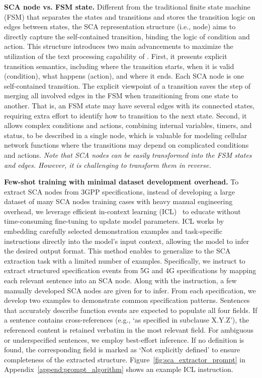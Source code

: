 \noindent\textbf{SCA node vs. FSM state.} Different from the traditional finite state machine (FSM) that separates the states and transitions and stores the transition logic on edges between states, the SCA representation structure (i.e., node) aims to directly capture the self-contained transition, binding the logic of condition and action. This structure introduces two main advancements to maximize the utilization of the text processing capability of \core. 
First, it presents explicit transition semantics, including where the transition starts, when it is valid (condition), what happens (action), and where it ends. Each SCA node is one self-contained transition. 
The explicit viewpoint of a transition saves the step of merging all involved edges in the FSM when transitioning from one state to another.  
That is, an FSM state may have several edges with its connected states, requiring extra effort to identify how to transition to the next state. 
Second, it allows complex conditions and actions, combining internal variables, timers, and status, to be described in a single node, which is valuable for modeling cellular network functions where the transitions may depend on complicated conditions and actions. \textit{Note that SCA nodes can be easily transformed into the FSM states and edges. However, it is challenging to transform them in reverse.} 


\noindent\textbf{Few-shot training with minimal dataset development overhead.}  
To extract SCA nodes from 3GPP specifications, instead of developing a large dataset of many SCA nodes training cases with heavy manual engineering overhead, we leverage efficient in-context learning (ICL)~\cite{brown2020language} to educate \lm without time-consuming fine-tuning to update model parameters.
ICL works by embedding carefully selected demonstration examples and task-specific instructions directly into the model’s input context, allowing the model to infer the desired output format. This method enables \lm to generalize to the SCA extraction task with a limited number of examples. 
Specifically, we instruct \lm to extract structured specification events from 5G and 4G specifications by mapping each relevant sentence into an SCA node. 
Along with the instruction, a few manually developed SCA nodes are given for \lm to infer. From each specification, we develop two examples to demonstrate common specification patterns. 
Sentences that accurately describe function events are expected to populate all four fields. 
If a sentence contains cross-references (e.g., `as specified in subclause X.Y.Z'), the referenced content is retained verbatim in the most relevant field. For ambiguous or underspecified sentences, we employ best-effort inference. If no definition is found, the corresponding field is marked as `Not explicitly defined' to ensure completeness of the extracted structure. Figure~\ref{fig:sca_extractor_prompt} in Appendix~\ref{append:prompt_algorithm} shows an example ICL instruction. 



